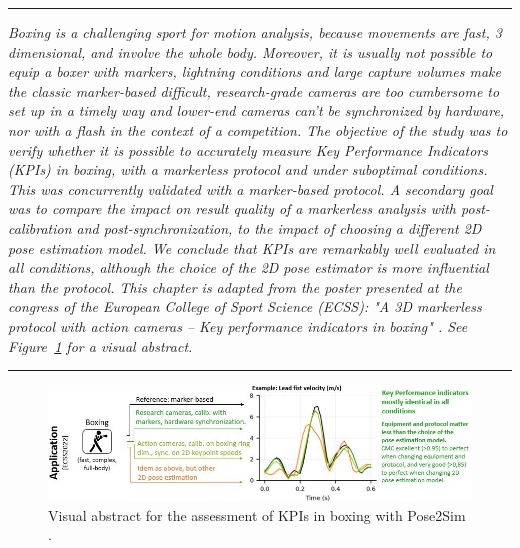\begin{center}
\rule{0.7\linewidth}{.5pt}
\begin{minipage}{0.7\linewidth}
\smallskip

\textit{Boxing is a challenging sport for motion analysis, because movements are fast, 3 dimensional, and involve the whole body. Moreover, it is usually not possible to equip a boxer with markers, lightning conditions and large capture volumes make the classic marker-based difficult, research-grade cameras are too cumbersome to set up in a timely way and lower-end cameras can't be synchronized by hardware, nor with a flash in the context of a competition.\newline\newline
The objective of the study was to verify whether it is possible to accurately measure Key Performance Indicators (KPIs) in boxing, with a markerless protocol and under suboptimal conditions. This was concurrently validated with a marker-based protocol. A secondary goal was to compare the impact on result quality of a markerless analysis with post-calibration and post-synchronization, to the impact of choosing a different 2D pose estimation model. We conclude that KPIs are remarkably well evaluated in all conditions, although the choice of the 2D pose estimator is more influential than the protocol.\newline \newline
This chapter is adapted from the poster presented at the congress of the European College of Sport Science (ECSS): "A 3D markerless protocol with action cameras – Key performance indicators in boxing" \cite{Pagnon2022c}. See Figure~\ref{fig_visabstract4} for a visual abstract.
}

\end{minipage}
\smallskip
\rule{0.7\linewidth}{.5pt}
\end{center}

\clearpage

\minitoc

\vspace*{3cm}

\begin{figure}[hbtp]
	\centering
	\def\svgwidth{1\columnwidth}
	\fontsize{10pt}{10pt}\selectfont
	\includegraphics[width=\linewidth]{"../Intro/Figures/Fig_VisAbstract4.JPG"}
      \caption{Visual abstract for the assessment of KPIs in boxing with Pose2Sim \cite{Pagnon2022c}.}
	\label{fig_visabstract4}
\end{figure}

